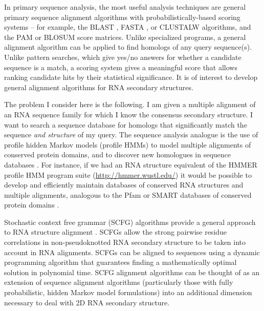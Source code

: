 \documentclass[11pt]{article}
\begin{document}
In primary sequence analysis, the most useful analysis techniques are
general primary sequence alignment algorithms with
probabilistically-based scoring systems -- for example, the BLAST
\cite{Altschul97}, FASTA \cite{Pearson88}, or CLUSTALW
\cite{Thompson94b} algorithms, and the PAM \cite{Dayhoff78} or BLOSUM
\cite{Henikoff92} score matrices. Unlike specialized programs, a
general alignment algorithm can be applied to find homologs of any
query sequence(s). Unlike pattern searches, which give yes/no answers
for whether a candidate sequence is a match, a scoring system gives a
meaningful score that allows ranking candidate hits by their
statistical significance. It is of interest to develop general
alignment algorithms for RNA secondary structures.

The problem I consider here is the following.  I am given a multiple
alignment of an RNA sequence family for which I know the consensus
secondary structure. I want to search a sequence database for homologs
that significantly match the sequence \emph{and structure} of my
query. The sequence analysis analogue is the use of profile hidden
Markov models (profile HMMs) to model multiple alignments of conserved
protein domains, and to discover new homologues in sequence databases
\cite{Krogh94,Eddy98}. For instance, if we had an RNA structure
equivalent of the HMMER profile HMM program suite
(\url{http://hmmer.wustl.edu/}) it would be possible to develop and
efficiently maintain databases of conserved RNA structures and
multiple alignments, analogous to the Pfam or SMART databases of
conserved protein domains \cite{Bateman02,LetunikBork02}.

Stochastic context free grammar (SCFG) algorithms provide a general
approach to RNA structure alignment
\cite{Eddy94,Sakakibara94c,Durbin98}. SCFGs allow the strong pairwise
residue correlations in non-pseudoknotted RNA secondary structure to
be taken into account in RNA alignments. SCFGs can be aligned to
sequences using a dynamic programming algorithm that guarantees
finding a mathematically optimal solution in polynomial time. SCFG
alignment algorithms can be thought of as an extension of sequence
alignment algorithms (particularly those with fully probabilistic,
hidden Markov model formulations) into an additional dimension
necessary to deal with 2D RNA secondary structure.
\end{document}
